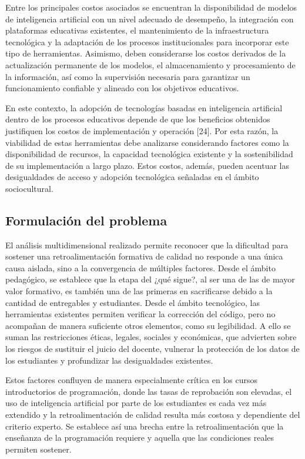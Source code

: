 \documentclass[letterpaper, 10 pt, conference]{ieeeconf}
\begin{document}
    Entre los principales costos asociados se encuentran la disponibilidad de modelos de inteligencia artificial con un nivel adecuado de desempeño, la integración con plataformas educativas existentes, el mantenimiento de la infraestructura tecnológica y la adaptación de los procesos institucionales para incorporar este tipo de herramientas. Asimismo, deben considerarse los costos derivados de la actualización permanente de los modelos, el almacenamiento y procesamiento de la información, así como la supervisión necesaria para garantizar un funcionamiento confiable y alineado con los objetivos educativos.

    En este contexto, la adopción de tecnologías basadas en inteligencia artificial dentro de los procesos educativos depende de que los beneficios obtenidos justifiquen los costos de implementación y operación [24]. Por esta razón, la viabilidad de estas herramientas debe analizarse considerando factores como la disponibilidad de recursos, la capacidad tecnológica existente y la sostenibilidad de su implementación a largo plazo. Estos costos, además, pueden acentuar las desigualdades de acceso y adopción tecnológica señaladas en el ámbito sociocultural.


    \subsection{Formulación del problema}
    El análisis multidimensional realizado permite reconocer que la dificultad para sostener una retroalimentación formativa de calidad no responde a una única causa aislada, sino a la convergencia de múltiples factores. Desde el ámbito pedagógico, se establece que la etapa del ¿qué sigue?, al ser una de las de mayor valor formativo, es también una de las primeras en sacrificarse debido a la cantidad de entregables y estudiantes. Desde el ámbito tecnológico, las herramientas existentes permiten verificar la corrección del código, pero no acompañan de manera suficiente otros elementos, como su legibilidad. A ello se suman las restricciones éticas, legales, sociales y económicas, que advierten sobre los riesgos de sustituir el juicio del docente, vulnerar la protección de los datos de los estudiantes y profundizar las desigualdades existentes.

    Estos factores confluyen de manera especialmente crítica en los cursos introductorios de programación, donde las tasas de reprobación son elevadas, el uso de inteligencia artificial por parte de los estudiantes es cada vez más extendido y la retroalimentación de calidad resulta más costosa y dependiente del criterio experto. Se establece así una brecha entre la retroalimentación que la enseñanza de la programación requiere y aquella que las condiciones reales permiten sostener.
    
\end{document}
